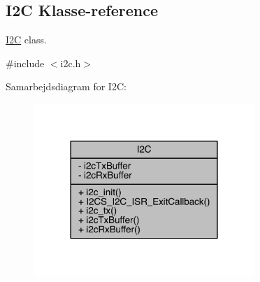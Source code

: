 \hypertarget{class_i2_c}{}\subsection{I2C Klasse-\/reference}
\label{class_i2_c}


\hyperlink{class_i2_c}{I2C} class.  




{\ttfamily \#include $<$i2c.\+h$>$}



Samarbejdsdiagram for I2C\+:
\nopagebreak
\begin{figure}[H]
\begin{center}
\leavevmode
\includegraphics[width=237pt]{df/d70/class_i2_c__coll__graph}
\end{center}
\end{figure}
